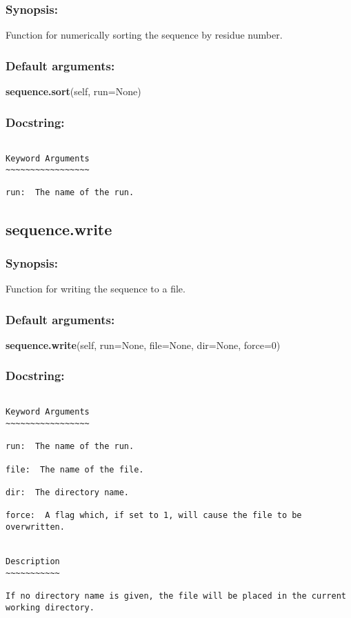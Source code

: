 \subsubsection{Synopsis:}

Function for numerically sorting the sequence by residue number.

\subsubsection{Default arguments:}

\textsf{\textbf{sequence.sort}(self, run=None)
}


\subsubsection{Docstring:}

{\scriptsize
\begin{verbatim}

Keyword Arguments
~~~~~~~~~~~~~~~~~

run:  The name of the run.
\end{verbatim}
}



\newpage

\subsection{sequence.write}


\subsubsection{Synopsis:}

Function for writing the sequence to a file.

\subsubsection{Default arguments:}

\textsf{\textbf{sequence.write}(self, run=None, file=None, dir=None, force=0)
}


\subsubsection{Docstring:}

{\scriptsize
\begin{verbatim}

Keyword Arguments
~~~~~~~~~~~~~~~~~

run:  The name of the run.

file:  The name of the file.

dir:  The directory name.

force:  A flag which, if set to 1, will cause the file to be overwritten.


Description
~~~~~~~~~~~

If no directory name is given, the file will be placed in the current working directory.
\end{verbatim}
}



